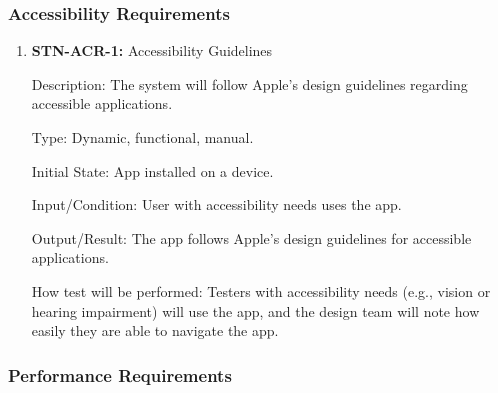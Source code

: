 \documentclass[12pt, titlepage]{article}
\begin{document}
    \subsubsection{Accessibility Requirements}

    \begin{enumerate}

        \item {\textbf{STN-ACR-1: }Accessibility Guidelines}

        Description: The system will follow Apple’s design guidelines regarding accessible applications.

        Type: Dynamic, functional, manual.

        Initial State: App installed on a device.

        Input/Condition: User with accessibility needs uses the app.

        Output/Result: The app follows Apple’s design guidelines for accessible applications.

        How test will be performed: Testers with accessibility needs (e.g., vision or hearing impairment) will use the app, and the design team will note how easily they are able to navigate the app.

    \end{enumerate}

    \subsubsection{Performance Requirements}
\end{document}
